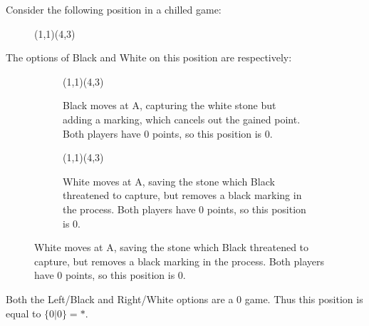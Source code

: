 \documentclass[../math194_paper.tex]{subfiles}
\begin{document}
Consider the following position in a chilled game:
\begin{figure}[H]
    \centering
    \begin{psgopartialboard*}{(1,1)(4,3)}

    \end{psgopartialboard*}
\end{figure}
The options of Black and White on this position are respectively:
\begin{figure}[H]
    \centering
    \begin{subfigure}[b]{0.45\linewidth}
    \centering
    \begin{psgopartialboard*}{(1,1)(4,3)}
        
    \end{psgopartialboard*}
    \caption{Black moves at A, capturing the white stone but adding a marking, which cancels out the gained 
    point. Both players have 0 points, so this position is 0.}
    \end{subfigure}
    \quad
    \begin{subfigure}[b]{0.45\linewidth}
    \centering
    \begin{psgopartialboard*}{(1,1)(4,3)}
        
    \end{psgopartialboard*}
    \caption{White moves at A, saving the stone which Black threatened to capture, but removes 
    a black marking in the process. Both players have 0 points, so this position is 0.}
    \end{subfigure}
\end{figure}
Both the Left/Black and Right/White options are a 0 game. Thus this position is equal to $\{0 | 0\} = *$. \\
\end{document}

